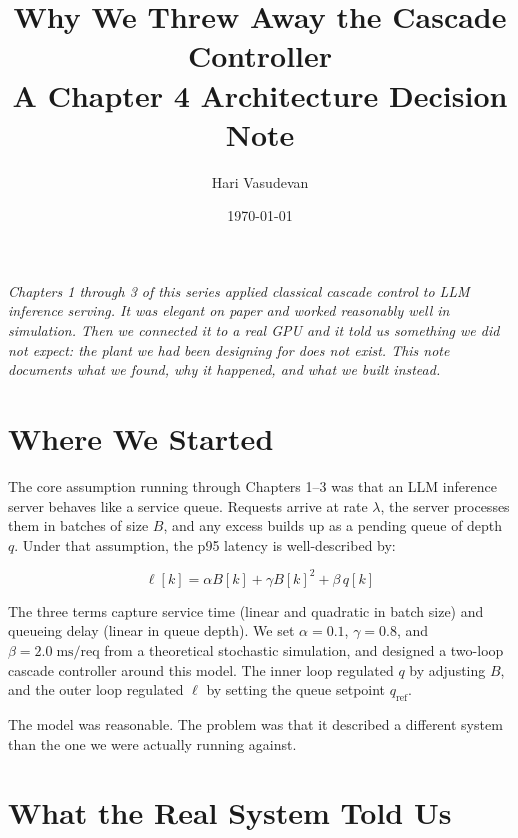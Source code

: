 \documentclass[11pt]{article}
\title{Why We Threw Away the Cascade Controller\\
       \large A Chapter 4 Architecture Decision Note}
\author{Hari Vasudevan}
\date{\today}
\begin{document}
\maketitle

\textit{Chapters 1 through 3 of this series applied classical cascade
control to LLM inference serving.  It was elegant on paper and worked
reasonably well in simulation.  Then we connected it to a real GPU and it
told us something we did not expect: the plant we had been designing for
does not exist.  This note documents what we found, why it happened, and
what we built instead.}

\section*{Where We Started}

The core assumption running through Chapters 1--3 was that an LLM inference
server behaves like a service queue.  Requests arrive at rate $\lambda$,
the server processes them in batches of size $B$, and any excess builds up
as a pending queue of depth $q$.  Under that assumption, the p95 latency is
well-described by:

\begin{equation}
    \ell[k] = \alpha B[k] + \gamma B[k]^2 + \beta\, q[k]
    \label{eq:model}
\end{equation}

The three terms capture service time (linear and quadratic in batch size)
and queueing delay (linear in queue depth).  We set $\alpha = 0.1$,
$\gamma = 0.8$, and $\beta = 2.0\;\text{ms/req}$ from a theoretical
stochastic simulation, and designed a two-loop cascade controller around
this model.  The inner loop regulated $q$ by adjusting $B$, and the outer
loop regulated $\ell$ by setting the queue setpoint $q_{\mathrm{ref}}$.

The model was reasonable.  The problem was that it described a different
system than the one we were actually running against.

\section*{What the Real System Told Us}
\end{document}
